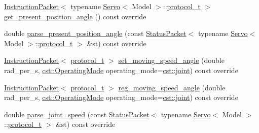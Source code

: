 \begin{DoxyCompactItemize}
\item 
\hyperlink{classdynamixel_1_1_instruction_packet}{Instruction\+Packet}$<$ typename \hyperlink{classdynamixel_1_1servos_1_1_servo}{Servo}$<$ Model $>$\+::\hyperlink{classdynamixel_1_1servos_1_1_servo_a7718c41cee1187b992836f4b6bad8a38}{protocol\+\_\+t} $>$ \hyperlink{classdynamixel_1_1servos_1_1_servo_a28c5330eed1d17ae41b0bbf5268d09e6}{get\+\_\+present\+\_\+position\+\_\+angle} () const override
\item 
double \hyperlink{classdynamixel_1_1servos_1_1_servo_a949e38cec51952288fb86b56c7a0748f}{parse\+\_\+present\+\_\+position\+\_\+angle} (const \hyperlink{classdynamixel_1_1_status_packet}{Status\+Packet}$<$ typename \hyperlink{classdynamixel_1_1servos_1_1_servo}{Servo}$<$ Model $>$\+::\hyperlink{classdynamixel_1_1servos_1_1_servo_a7718c41cee1187b992836f4b6bad8a38}{protocol\+\_\+t} $>$ \&st) const override
\item 
\hyperlink{classdynamixel_1_1_instruction_packet}{Instruction\+Packet}$<$ \hyperlink{classdynamixel_1_1servos_1_1_servo_a7718c41cee1187b992836f4b6bad8a38}{protocol\+\_\+t} $>$ \hyperlink{classdynamixel_1_1servos_1_1_servo_a35e4d514a5a87ae20c80e36b95a7a894}{set\+\_\+moving\+\_\+speed\+\_\+angle} (double rad\+\_\+per\+\_\+s, \hyperlink{namespacedynamixel_1_1servos_1_1cst_ac17b5608f65c6495114d34f8efc4d809}{cst\+::\+Operating\+Mode} operating\+\_\+mode=\hyperlink{namespacedynamixel_1_1servos_1_1cst_ac17b5608f65c6495114d34f8efc4d809a1fdfcfad31f04d24b25c0842e9d99c48}{cst\+::joint}) const override
\item 
\hyperlink{classdynamixel_1_1_instruction_packet}{Instruction\+Packet}$<$ \hyperlink{classdynamixel_1_1servos_1_1_servo_a7718c41cee1187b992836f4b6bad8a38}{protocol\+\_\+t} $>$ \hyperlink{classdynamixel_1_1servos_1_1_servo_a31c0e19f19709071556585881b36e2a6}{reg\+\_\+moving\+\_\+speed\+\_\+angle} (double rad\+\_\+per\+\_\+s, \hyperlink{namespacedynamixel_1_1servos_1_1cst_ac17b5608f65c6495114d34f8efc4d809}{cst\+::\+Operating\+Mode} operating\+\_\+mode=\hyperlink{namespacedynamixel_1_1servos_1_1cst_ac17b5608f65c6495114d34f8efc4d809a1fdfcfad31f04d24b25c0842e9d99c48}{cst\+::joint}) const override
\item 
double \hyperlink{classdynamixel_1_1servos_1_1_servo_aecbc3c2ff71bff6af97e1d1d4dbbfffa}{parse\+\_\+joint\+\_\+speed} (const \hyperlink{classdynamixel_1_1_status_packet}{Status\+Packet}$<$ typename \hyperlink{classdynamixel_1_1servos_1_1_servo}{Servo}$<$ Model $>$\+::\hyperlink{classdynamixel_1_1servos_1_1_servo_a7718c41cee1187b992836f4b6bad8a38}{protocol\+\_\+t} $>$ \&st) const override
\end{DoxyCompactItemize}
